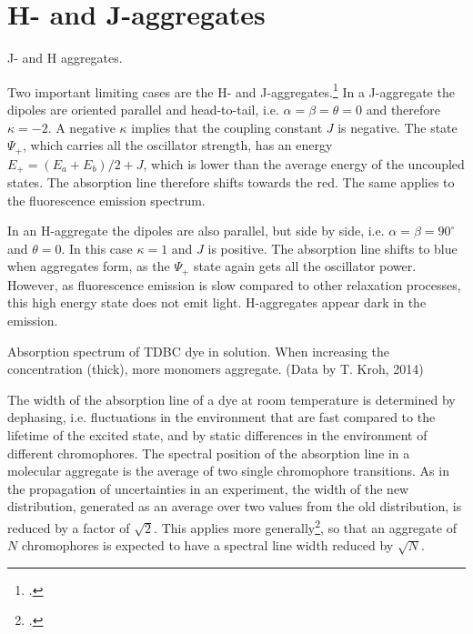 \section{H- and J-aggregates}

\begin{marginfigure}

\caption{J- and H aggregates.}
\end{marginfigure}

Two important limiting cases are the H- and J-aggregates.\footcite[chapters 2.1.4.3, 2.2.5.3]{KoehlerBaessler2015} In a J-aggregate the dipoles are oriented parallel and head-to-tail, i.e. $\alpha = \beta = \theta = 0$ and therefore $\kappa = -2$. A negative $\kappa$ implies that the coupling constant $J$ is negative. The state $\Psi_+$, which carries all the oscillator strength, has an energy $E_+ = (E_a + E_b) / 2 + J$, which is lower than the average energy of the uncoupled states. The absorption line therefore shifts towards the red. The same applies to the fluorescence emission spectrum.

In an H-aggregate the dipoles are also parallel, but side by side, i.e. $\alpha = \beta = 90^\circ$ and $\theta = 0$. In this case $\kappa =1$ and $J$ is positive. The absorption line shifts to blue when aggregates form, as the $\Psi_+$ state again gets all the oscillator power. However, as fluorescence emission is slow compared to other relaxation processes, this high energy state does not emit light. H-aggregates appear dark in the emission.

\begin{marginfigure}

\caption{Absorption spectrum of TDBC dye in solution. When increasing the concentration (thick), more monomers aggregate. (Data by T. Kroh, 2014) }
\end{marginfigure}


The width of the absorption line of a dye at room temperature is determined by dephasing, i.e. fluctuations in the environment that are fast compared to the lifetime of the excited state, and by static differences in the environment of different chromophores. The spectral position of the absorption line in a molecular aggregate is the average of two single chromophore transitions. As in the propagation of uncertainties in an experiment, the width of the new distribution, generated as an average over two values from the old distribution, is reduced by a factor of $\sqrt{2}$. This applies more generally\footcite{Knapp1984}, so that an aggregate of $N$ chromophores is expected to have a spectral line width reduced by $\sqrt{N}$.




